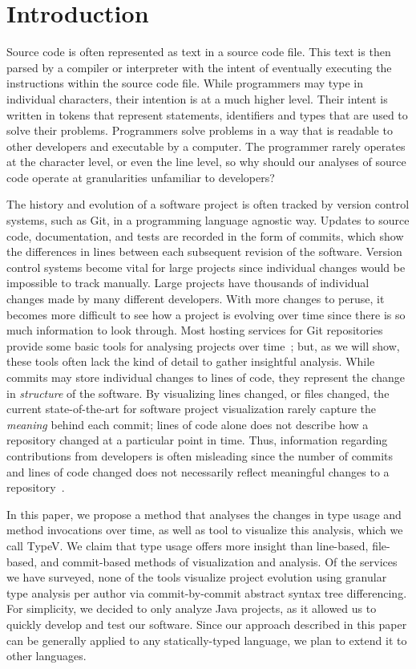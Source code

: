 \documentclass[conference]{IEEEtran}
\begin{document}
\section{Introduction}

Source code is often represented as text in a source code file. This text is then parsed by a compiler or interpreter with the intent of eventually executing the instructions within the source code file. While programmers may type in individual characters, their intention is at a much higher level. Their intent is written in tokens that represent statements, identifiers and types that are used to solve their problems. Programmers solve problems in a way that is readable to other developers and executable by a computer. The programmer rarely operates at the character level, or even the line level, so why should our analyses of source code operate at granularities unfamiliar to developers?

The history and evolution of a software project is often tracked by version control systems, such as Git, in a programming language agnostic way. Updates to source code, documentation, and tests are recorded in the form of commits, which show the differences in lines between each subsequent revision of the software. Version control systems become vital for large projects since individual changes would be impossible to track manually. Large projects have thousands of individual changes made by many different developers. With more changes to peruse, it becomes more difficult to see how a project is evolving over time since there is so much information to look through. Most hosting services for Git repositories provide some basic tools for analysing projects over time~\cite{github-graphs,bitbucket-graphs}; but, as we will show, these tools often lack the kind of detail to gather insightful analysis. While commits may store individual changes to lines of code, they represent the change in \emph{structure} of the software.  By visualizing lines changed, or files changed, the current state-of-the-art for software project visualization rarely capture the \emph{meaning} behind each commit; lines of code alone does not describe how a repository changed at a particular point in time. Thus, information regarding contributions from developers is often misleading since the number of commits and lines of code changed does not necessarily reflect meaningful changes to a repository~\cite{robles2014}.

In this paper, we propose a method that analyses the changes in type usage and method invocations over time, as well as tool to visualize this analysis, which we call TypeV. We claim that type usage offers more insight than line-based, file-based, and commit-based methods of visualization and analysis. Of the services we have surveyed, none of the tools visualize project evolution using granular type analysis per author via commit-by-commit abstract syntax tree differencing. For simplicity, we decided to only analyze Java projects, as it allowed us to quickly develop and test our software. Since our approach described in this paper can be generally applied to any statically-typed language, we plan to extend it to other languages.
\end{document}
